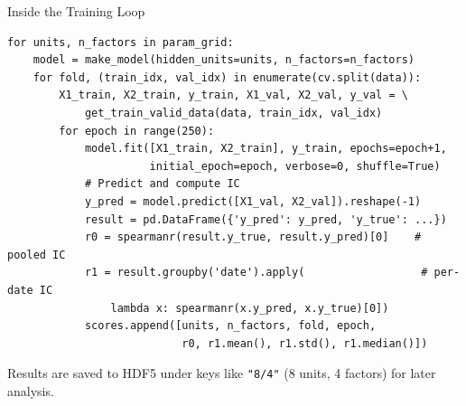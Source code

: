 \documentclass[aspectratio=169, 11pt]{beamer}
\begin{document}
%
%
\begin{frame}[fragile]{Inside the Training Loop}

\begin{lstlisting}
for units, n_factors in param_grid:
    model = make_model(hidden_units=units, n_factors=n_factors)
    for fold, (train_idx, val_idx) in enumerate(cv.split(data)):
        X1_train, X2_train, y_train, X1_val, X2_val, y_val = \
            get_train_valid_data(data, train_idx, val_idx)
        for epoch in range(250):
            model.fit([X1_train, X2_train], y_train, epochs=epoch+1,
                      initial_epoch=epoch, verbose=0, shuffle=True)
            # Predict and compute IC
            y_pred = model.predict([X1_val, X2_val]).reshape(-1)
            result = pd.DataFrame({'y_pred': y_pred, 'y_true': ...})
            r0 = spearmanr(result.y_true, result.y_pred)[0]    # pooled IC
            r1 = result.groupby('date').apply(                  # per-date IC
                lambda x: spearmanr(x.y_pred, x.y_true)[0])
            scores.append([units, n_factors, fold, epoch,
                           r0, r1.mean(), r1.std(), r1.median()])
\end{lstlisting}

\vspace{0.15cm}

Results are saved to HDF5 under keys like \texttt{"8/4"} (8 units, 4 factors) for later analysis.

\end{frame}
%
\end{document}
